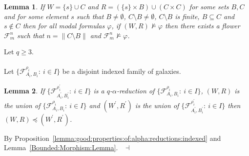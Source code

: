 \documentclass[draft]{article}
\newtheorem{lemma}{Lemma}
\newenvironment{proof}{{\bf Proof:}}{~$\dashv$\\}
\begin{document}
%
%
\begin{lemma}\label{lemma:about:finite:subset:when:K5:shape:of:the:frame:bis}
%
%
If $W{=}\{s\}{\cup}C$ and $R{=}(\{s\}{\times}B){\cup}(C{\times}C)$ for some sets $B,C$ and for some element $s$ such that $B{\not=}\emptyset$, $C{\setminus}B{\not=}\emptyset$, $C{\setminus}B$ is finite, $B{\subseteq}C$ and $s{\not\in}C$ then for all modal formulas $\varphi$, if $(W,R){\not\models}\varphi$ then there exists a flower ${\mathcal F}_{m}^{n}$ such that $n{=}{\parallel}C{\setminus}B{\parallel}$ and ${\mathcal F}_{m}^{n}{\not\models}\varphi$.
%
%
\end{lemma}
%
%
Let $q{\geq}3$.
%
%
\\
\\
%
%
Let $\{{\mathcal F}_{A_{i},B_{i}}^{\rho_{i}}:\ i{\in}I\}$ be a disjoint indexed family of galaxies.
%
%
\begin{lemma}\label{lemma:alpha:reduction:modal:logic}
%
%
If $\{{\mathcal F}_{A_{i}^{\prime},B_{i}^{\prime}}^{\rho_{i}^{\prime}}:\ i{\in}I\}$ is a $q$-$\alpha$-reduction of $\{{\mathcal F}_{A_{i},B_{i}}^{\rho_{i}}:\ i{\in}I\}$, $(W,R)$ is the union of $\{{\mathcal F}_{A_{i},B_{i}}^{\rho_{i}}:\ i{\in}I\}$ and $(W^{\prime},R^{\prime})$ is the union of $\{{\mathcal F}_{A_{i}^{\prime},B_{i}^{\prime}}^{\rho_{i}^{\prime}}:\ i{\in}I\}$ then $(W,R){\preceq}(W^{\prime},R^{\prime})$.
%
%
\end{lemma}
%
%
\begin{proof}
%
%
By Proposition~\ref{lemma:good:properties:of:alpha:reductions:indexed} and Lemma~\ref{Bounded:Morphism:Lemma}.
%
%
\medskip
%
%
\end{proof}
%
%
\end{document}
